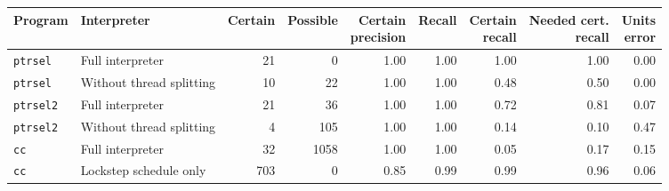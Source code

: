 \begin{tabular}{llrrrrrrr}
\toprule
Program & Interpreter & Certain & Possible & \shortstack{Certain\\precision} & Recall & \shortstack{Certain\\recall} & \shortstack{Needed cert.\\recall} & \shortstack{Units\\error} \\
\midrule
\texttt{ptrsel} & Full interpreter & 21 & 0 & 1.00 & 1.00 & 1.00 & 1.00 & 0.00 \\
\texttt{ptrsel} & Without thread splitting & 10 & 22 & 1.00 & 1.00 & 0.48 & 0.50 & 0.00 \\
\addlinespace
\texttt{ptrsel2} & Full interpreter & 21 & 36 & 1.00 & 1.00 & 0.72 & 0.81 & 0.07 \\
\texttt{ptrsel2} & Without thread splitting & 4 & 105 & 1.00 & 1.00 & 0.14 & 0.10 & 0.47 \\
\addlinespace
\texttt{cc} & Full interpreter & 32 & 1058 & 1.00 & 1.00 & 0.05 & 0.17 & 0.15 \\
\texttt{cc} & Lockstep schedule only & 703 & 0 & 0.85 & 0.99 & 0.99 & 0.96 & 0.06 \\
\bottomrule
\end{tabular}
